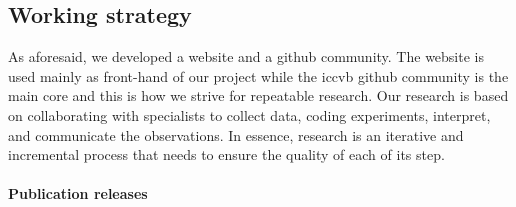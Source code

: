 \subsection{Working strategy}
As aforesaid, we developed a website and a github community.
The website is used mainly as front-hand of our project while the \ac{iccvb} github community is the main core and this is how we strive for repeatable research.
Our research is based on collaborating with specialists to collect data, coding experiments, interpret, and communicate the observations.
In essence, research is an iterative and incremental process that needs to ensure the quality of each of its step. 


\paragraph{Publication releases}


